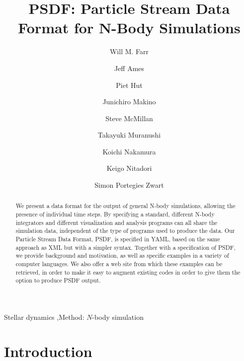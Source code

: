 \documentclass[5p,authoryear]{elsarticle}
\begin{document}
\title{PSDF: Particle Stream Data Format for N-Body Simulations}

\author[WMF]{Will M. Farr}
\author[JA]{Jeff Ames}
\author[PH]{Piet Hut}
\author[JM]{Junichiro Makino}
\author[SM]{Steve McMillan}
\author[TM]{Takayuki Muranushi}
\author[KN]{Koichi Nakamura}
\author[KN2]{Keigo Nitadori}
\author[SPZ]{Simon Portegies Zwart}


\address[WMF]{Northwestern University Center for Interdisciplinary
  Research in Astrophysics, 2145 Sheridan Rd., Evanston IL 60208 USA}

\address[JM]{Interactive Research Center of Science, Graduate
  School of Science and Engineering Tokyo Institute of Technology,
  2--12--1 Ookayama, Meguro, Tokyo 152-8551, Japan}

\address[PH]{Institute for Advanced Study, Princeton, NJ 08540, USA}

\begin{abstract}
  We present a data format for the output of general N-body
  simulations, allowing the presence of individual time steps.  By
  specifying a standard, different N-body integrators and different
  visualization and analysis programs can all share the simulation
  data, independent of the type of programs used to produce the data.
  Our Particle Stream Data Format, PSDF, is specified in YAML, based
  on the same approach as XML but with a simpler syntax.  Together
  with a specification of PSDF, we provide background and motivation,
  as well as specific examples in a variety of computer languages.  We
  also offer a web site from which these examples can be retrieved, in
  order to make it easy to augment existing codes in order to give
  them the option to produce PSDF output.
\end{abstract}

\begin{keyword}
  Stellar dynamics \sep Method: $N$-body simulation
\end{keyword}

\maketitle

\section{Introduction}
\end{document}
